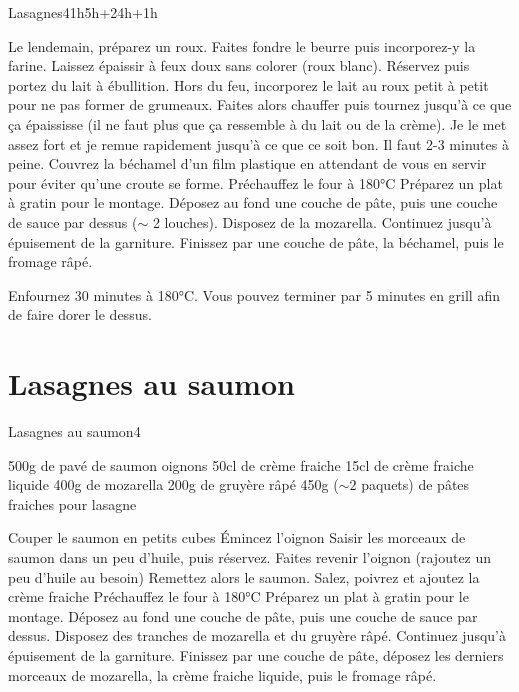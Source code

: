 {\begin{recette}{Lasagnes}{4}{1h}{5h+24h+1h}
\begin{preparation}
\etape Le lendemain, préparez un roux. Faites fondre le beurre puis incorporez-y la farine. Laissez épaissir à feux doux sans colorer (roux blanc).
\etape Réservez puis portez du lait à ébullition.
\etape Hors du feu, incorporez le lait au roux petit à petit pour ne pas former de grumeaux. 
\etape Faites alors chauffer puis tournez jusqu'à ce que ça épaississe (il ne faut plus que ça ressemble à du lait ou de la crème). Je le met assez fort et je remue rapidement jusqu'à ce que ce soit bon. Il faut 2-3 minutes à peine. 
\etape Couvrez la béchamel d'un film plastique en attendant de vous en servir pour éviter qu'une croute se forme.
\etape Préchauffez le four à 180°C
\etape Préparez un plat à gratin pour le montage. Déposez au fond une couche de pâte, puis une couche de sauce par dessus ($\sim$ 2 louches). 
Disposez de la mozarella. Continuez jusqu'à épuisement de la garniture. 
\etape Finissez par une couche de pâte, la béchamel, puis le fromage râpé. 
\end{preparation}

\begin{cuisson}
Enfournez 30 minutes à 180°C. Vous pouvez terminer par 5 minutes en grill afin de faire dorer le dessus.

\end{cuisson}
\end{recette}

\section{Lasagnes au saumon}
\begin{recette}{Lasagnes au saumon}{4}{}{}
\begin{ingredients}
\ingredient 500g de pavé de saumon
 oignons
\ingredient 50cl de crème fraiche
\ingredient 15cl de crème fraiche liquide
\ingredient 400g de mozarella
\ingredient 200g de gruyère râpé
\ingredient 450g ($\sim 2$ paquets) de pâtes fraiches pour lasagne
\end{ingredients}

\begin{preparation}
\etape Couper le saumon en petits cubes
\etape Émincez l'oignon
\etape Saisir les morceaux de saumon dans un peu d'huile, puis réservez.
\etape Faites revenir l'oignon (rajoutez un peu d'huile au besoin)
\etape Remettez alors le saumon. Salez, poivrez et ajoutez la crème fraiche
\etape Préchauffez le four à 180°C
\etape Préparez un plat à gratin pour le montage. Déposez au fond une couche de pâte, puis une couche de sauce par dessus. 
Disposez des tranches de mozarella et du gruyère râpé. Continuez jusqu'à épuisement de la garniture. 
\etape Finissez par une couche de pâte, déposez les derniers morceaux de mozarella, la crème fraiche liquide, puis le fromage 
râpé. 
\end{preparation}


\end{recette}}
